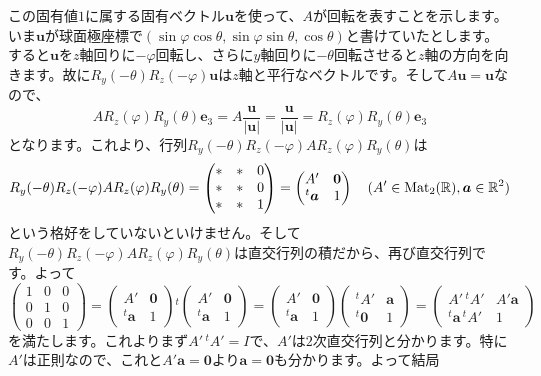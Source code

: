この固有値$1$に属する固有ベクトル$\bm{u}$を使って、$A$が回転を表すことを示します。いま$\bm{u}$が球面極座標で$(\sin\varphi \cos\theta, \sin\varphi \sin\theta, \cos\theta)$と書けていたとします。すると$\bm{u}$を$z$軸回りに$-\varphi$回転し、さらに$y$軸回りに$-\theta$回転させると$z$軸の方向を向きます。故に$R_y(-\theta) R_z(-\varphi) \bm{u}$は$z$軸と平行なベクトルです。そして$A\bm{u} = \bm{u}$なので、
\[
A R_z(\varphi) R_y(\theta) \bm{e}_3 = A \frac{\bm{u}}{|\bm{u}|} = \frac{\bm{u}}{|\bm{u}|} = R_z(\varphi) R_y(\theta) \bm{e}_3
\]
となります。これより、行列$R_y(-\theta) R_z(-\varphi) A R_z(\varphi) R_y(\theta)$は
\[
R_y(-\theta) R_z(-\varphi) A R_z(\varphi) R_y(\theta) = 
\begin{pmatrix}
* & * & 0 \\
* & * & 0 \\
* & * & 1
\end{pmatrix}
=
\begin{pmatrix}
A' & \boldsymbol{0} \\
{}^t\boldsymbol{a} & 1
\end{pmatrix} \quad (A' \in \operatorname{Mat}_2(\mathbb{R}), \boldsymbol{a} \in \mathbb{R}^2)
\]
という格好をしていないといけません。そして$R_y(-\theta) R_z(-\varphi) A R_z(\varphi) R_y(\theta)$は直交行列の積だから、再び直交行列です。よって
\[
\begin{pmatrix}
1 & 0 & 0 \\
0 & 1 & 0 \\
0 & 0 & 1
\end{pmatrix}
=
\begin{pmatrix}
A' & \bm{0} \\
{}^t\bm{a} & 1
\end{pmatrix}
{}^t
\begin{pmatrix}
A' & \bm{0} \\
{}^t\bm{a} & 1
\end{pmatrix}
=
\begin{pmatrix}
A' & \bm{0} \\
{}^t\bm{a} & 1
\end{pmatrix}
\begin{pmatrix}
{}^t\!A' & \bm{a} \\
{}^t\bm{0} & 1
\end{pmatrix}
=
\begin{pmatrix}
A'\,{}^t\!A' & A'\bm{a} \\
{}^t\bm{a}\,{}^t\!A' & 1
\end{pmatrix}
\]
を満たします。これよりまず$A'\,{}^t\!A' = I$で、$A'$は$2$次直交行列と分かります。特に$A'$は正則なので、これと$A' \bm{a} = \bm{0}$より$\bm{a} = \bm{0}$も分かります。よって結局
